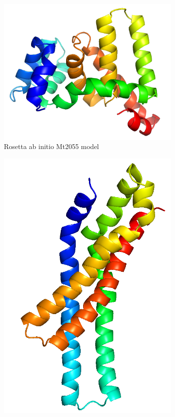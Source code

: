 \begin{figure}[htb]
    \centering %
\begin{subfigure}{0.25\textwidth}
  \includegraphics[width=\linewidth]{Results/w9_ros.png}
  \caption{Rosetta ab initio Mt2055 model}
  \label{fig:w9_ros}
\end{subfigure}\hfil %
\begin{subfigure}{0.25\textwidth}
  \includegraphics[width=\linewidth]{Results/w9_rosM.png}

\end{subfigure}
\end{figure}
